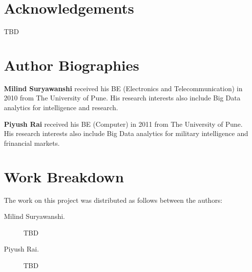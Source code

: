 \documentclass[9pt,twocolumn,twoside]{styles/osajnl}
\begin{document}
\section*{Acknowledgements}

TBD




 
\section*{Author Biographies}
\begingroup
\setlength\intextsep{0pt}
\begin{minipage}{1.0\columnwidth}
  \noindent
  {\bfseries Milind Suryawanshi} received his BE (Electronics and Telecommunication) in 2010 from
  The University of Pune. His research interests also include Big Data analytics for intelligence and research. 
\end{minipage}
\begin{minipage}{1.0\columnwidth} 
  \noindent
  {\bfseries Piyush Rai} received his BE (Computer) in 2011 from
  The University of Pune. His research interests also include Big Data analytics for military intelligence and frinancial markets. 
\end{minipage}

\endgroup

\newpage

\appendix

\section{Work Breakdown}

The work on this project was distributed as follows between the
authors:

\begin{description}

\item[Milind Suryawanshi.] TBD

\item[Piyush Rai.] TBD

\end{description}
\end{document}
